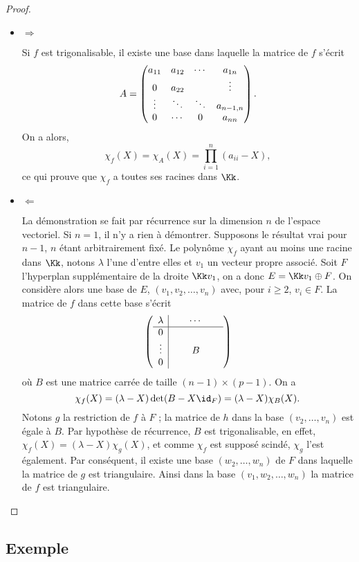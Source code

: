\documentclass[12pt, class=report,crop=false]{standalone}
\begin{document}
\begin{proof}~
\begin{itemize}

\item $\Longrightarrow$ 

Si $f$ est trigonalisable, il existe une base dans laquelle la matrice de $f$ s'écrit
$$A=\begin{pmatrix}a_{11}&a_{12}&\cdots &a_{1n} \cr 0&a_{22} & &\vdots \cr\vdots &\ddots &\ddots& a_{n-1,n}\cr0&\cdots&0&a_{nn}\end{pmatrix}.$$
On a alors,
$$\chi_f(X)=\chi_A(X)=\prod_{i=1}^n(a_{ii}-X),$$
ce qui prouve que $\chi_f$ a toutes ses racines dans $\Kk$.

\item $\Longleftarrow$ 

La démonstration se fait par récurrence sur la dimension $n$ de l'espace vectoriel. 
Si $n=1$, il n'y a rien à démontrer. Supposons le résultat vrai pour $n-1$, $n$ étant arbitrairement fixé. Le polynôme $\chi_f$ ayant au moins une racine dans $\Kk$, 
notons $\lambda$ l'une d'entre elles et $v_1$ un vecteur propre associé. 
Soit $F$ l'hyperplan supplémentaire de la droite $\Kk v_1$, on a donc $E = \Kk v_1 \oplus F$. 
On considère alors une base de $E$, $(v_1,v_2,\ldots,v_n)$ avec, pour $i \ge 2$, 
$v_i\in F$. La matrice de $f$ dans cette base s'écrit
$$\left(\begin{array}{c|ccc}
\lambda &\ \  &\cdots&\ \  \cr \hline
0 &\ &\ & \cr
\vdots& & B &\cr
0&\ &\ &\  
\end{array}\right)$$
où $B$ est une matrice carrée de taille $(n-1)\times(p-1)$. On a 
$$\chi_f(X)=(\lambda-X)\det(B-X\id_F)=(\lambda-X)\chi_B(X).$$
Notons $g$ la restriction de $f$ à $F$ ; la matrice de $h$ dans la base $(v_2,\ldots,v_n)$ est égale à $B$. Par hypothèse de récurrence, $B$ est trigonalisable, en effet, 
$\chi_f(X)=(\lambda-X)\chi_g(X)$,
 et comme $\chi_f$ est supposé scindé, $\chi_g$ l'est également. 
 Par conséquent, il existe une base $(w_2,\ldots,w_n)$ de $F$ dans laquelle la matrice de $g$ est triangulaire. Ainsi dans la base $(v_1,w_2,\ldots,w_n)$ la matrice de $f$ est triangulaire.
\end{itemize}
\end{proof} 



\subsection{Exemple}
\end{document}
